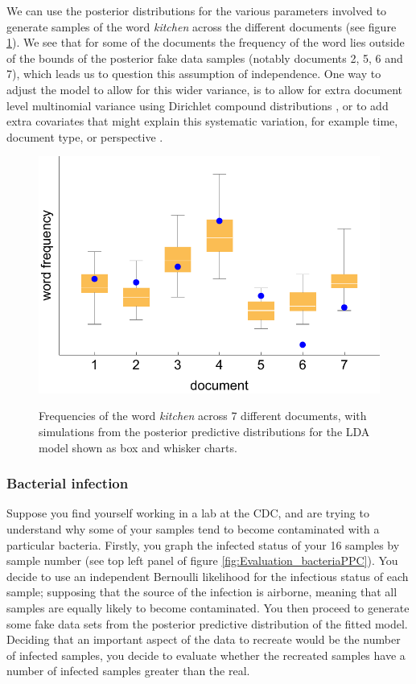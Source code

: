 \documentclass[11pt,fullpage]{book}
\begin{document}
We can use the posterior distributions for the various parameters involved to generate samples of the word \textit{kitchen} across the different documents (see figure \ref{fig:Evaluation_wordPPC}). We see that for some of the documents the frequency of the word lies outside of the bounds of the posterior fake data samples (notably documents 2, 5, 6 and 7), which leads us to question this assumption of independence. One way to adjust the model to allow for this wider variance, is to allow for extra document level multinomial variance using Dirichlet compound distributions \cite{mimno2011bayesian}, or to add extra covariates that might explain this systematic variation, for example time, document type, or perspective \cite{blei2003latent}.

\begin{figure}
\centering
\scalebox{0.8} 
{\includegraphics{Evaluation_wordPPC.pdf}}
\caption{Frequencies of the word \textit{kitchen} across 7 different documents, with simulations from the posterior predictive distributions for the LDA model shown as box and whisker charts.}\label{fig:Evaluation_wordPPC}
\end{figure} 

\subsubsection{Bacterial infection}
Suppose you find yourself working in a lab at the CDC, and are trying to understand why some of your samples tend to become contaminated with a particular bacteria. Firstly, you graph the infected status of your 16 samples by sample number (see top left panel of figure \ref{fig:Evaluation_bacteriaPPC}). You decide to use an independent Bernoulli likelihood for the infectious status of each sample; supposing that the source of the infection is airborne, meaning that all samples are equally likely to become contaminated. You then proceed to generate some fake data sets from the posterior predictive distribution of the fitted model. Deciding that an important aspect of the data to recreate would be the number of infected samples, you decide to evaluate whether the recreated samples have a number of infected samples greater than the real.
\end{document}
